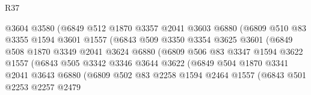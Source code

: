 \begin{lexlean}{R37}
\begin{coremodule}
                            @3604
                            @3580
                            (@6849
                              @512
                              @1870
                              @3357
                              @2041
                              @3603
                              @6880
                              (@6809
                                @510
                                @83
                                @3355
                                @1594
                                @3601
                                @1557
                                (@6843
                                  @509
                                  @3350
                                  @3354
                                  @3625
                                  @3601
                                  (@6849
                                    @508
                                    @1870
                                    @3349
                                    @2041
                                    @3624
                                    @6880
                                    (@6809
                                      @506
                                      @83
                                      @3347
                                      @1594
                                      @3622
                                      @1557
                                      (@6843
                                        @505
                                        @3342
                                        @3346
                                        @3644
                                        @3622
                                        (@6849
                                          @504
                                          @1870
                                          @3341
                                          @2041
                                          @3643
                                          @6880
                                          (@6809
                                            @502
                                            @83
                                            @2258
                                            @1594
                                            @2464
                                            @1557
                                            (@6843
                                              @501
                                              @2253
                                              @2257
                                              @2479

\end{coremodule}
\end{lexlean}
